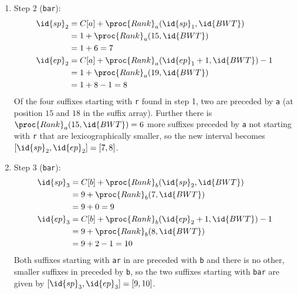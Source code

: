 \begin{Example}
\begin{enumerate}
    \item Step 2 (\texttt{b{\color{red}ar}}):
    \begin{align*}
      \id{sp}_2 &= C[a] + \proc{Rank}_a(\id{sp}_1, \id{BWT}) \\
                &= 1 + \proc{Rank}_a(15, \id{BWT}) \\
                &= 1 + 6 = 7 \\
      \id{ep}_2 &= C[a] + \proc{Rank}_a(\id{ep}_1 + 1, \id{BWT}) - 1 \\
                &= 1 + \proc{Rank}_a(19, \id{BWT}) \\
                &= 1 + 8 - 1 = 8
    \end{align*}
    Of the four suffixes starting with \texttt{r} found in step 1, two are preceded by \texttt{a} (at position $15$ and $18$ in the suffix array). Further there is $\proc{Rank}_a(15, \id{BWT})=6$ more suffixes preceded by \texttt{a} not starting with \texttt{r} that are lexicographically smaller, so the new interval becomes $[\id{sp}_2,\id{ep}_2]=[7,8]$.

    \item Step 3 (\texttt{{\color{red}bar}}):
    \begin{align*}
      \id{sp}_3 &= C[b] + \proc{Rank}_b(\id{sp}_2, \id{BWT}) \\
                &= 9 + \proc{Rank}_b(7, \id{BWT}) \\
                &= 9 + 0 = 9 \\
      \id{ep}_3 &= C[b] + \proc{Rank}_b(\id{ep}_2 + 1, \id{BWT}) - 1 \\
                &= 9 + \proc{Rank}_b(8, \id{BWT}) \\
                &= 9 + 2 - 1 = 10
    \end{align*}
    Both suffixes starting with \texttt{ar} in  are preceded with \texttt{b} and there is no other, smaller suffixes in  preceded by \texttt{b}, so the two suffixes starting with \texttt{bar} are given by $[\id{sp}_3,\id{ep}_3]=[9,10]$.
  \end{enumerate}
\end{Example}
